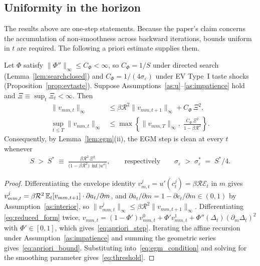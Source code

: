 \subsection{Uniformity in the horizon}
\label{subsec:smooth_uniform}

The results above are one-step statements. Because the paper's claim concerns the
accumulation of non-smoothness across backward iterations, bounds uniform in $t$ are
required. The following a priori estimate supplies them.

\begin{proposition}
\label{prop:uniform}
Let $\Phi$ satisfy $\|\Phi''\|_{\infty}\le C_\Phi<\infty$, so
$C_\Phi=1/S$ under directed search (Lemma~\ref{lem:searchclosed}) and
$C_\Phi=1/(4\sigma_\varepsilon)$ under EV Type~I taste shocks
(Proposition~\ref{prop:evtaste}). Suppose
Assumptions~\ref{as:u}--\ref{as:impatience} hold and $\Xi\equiv\sup_t\Xi_t<\infty$.
Then
\begin{align}
\big\|v_{mm,t}\big\|_{\infty}
&\le \beta\mathcal{R}^{2}\big\|v_{mm,t+1}\big\|_{\infty} + C_\Phi\,\Xi^{2},
\label{eq:apriori_step}\\[2pt]
\sup_{t\le T}\big\|v_{mm,t}\big\|_{\infty}
&\le \max\left\{\big\|v_{mm,T}\big\|_{\infty},\;
\frac{C_\Phi\,\Xi^{2}}{1-\beta\mathcal{R}^{2}}\right\}.
\label{eq:apriori_bound}
\end{align}
Consequently, by Lemma~\ref{lem:egm}(ii), the EGM step is clean at every $t$ whenever
\begin{align}
S \;>\; S^{\ast} \;\equiv\;
\frac{\beta\mathcal{R}^{2}\,\Xi^{2}}{\big(1-\beta\mathcal{R}^{2}\big)\,\inf\big|u''\big|},
\qquad\text{respectively}\qquad
\sigma_\varepsilon \;>\; \sigma_\varepsilon^{\ast} \;=\; S^{\ast}/4 .
\label{eq:threshold}
\end{align}
\end{proposition}

\begin{proof}
Differentiating the envelope identity $v_{m,t}^{j}=u'(c_t^{j})=\beta\mathcal{R}\mathcal{E}_t$
in $m$ gives
$v_{mm,t}^{j}=\beta\mathcal{R}^{2}\,\mathbb{E}_t[v_{mm,t+1}]\cdot\partial a_t/\partial m$, and
$\partial a_t/\partial m=1-\partial c_t/\partial m\in(0,1)$ by
Assumption~\ref{as:interior}, so
$\|v_{mm,t}^{j}\|_{\infty}\le\beta\mathcal{R}^{2}\|v_{mm,t+1}\|_{\infty}$. Differentiating
\eqref{eq:reduced_form} twice,
$v_{mm,t}=(1-\Phi')v_{mm,t}^{0}+\Phi'v_{mm,t}^{1}+\Phi''(\Delta_t)(\partial_m\Delta_t)^{2}$
with $\Phi'\in[0,1]$, which gives~\eqref{eq:apriori_step}. Iterating the affine
recursion under Assumption~\ref{as:impatience} and summing the geometric series
gives~\eqref{eq:apriori_bound}. Substituting into~\eqref{eq:egm_condition} and solving
for the smoothing parameter gives~\eqref{eq:threshold}.
\end{proof}

